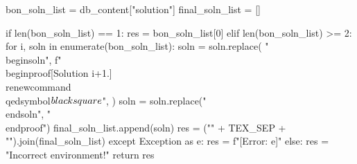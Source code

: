 \begin{pycode}
            bon_soln_list = db_content["solution"]
            final_soln_list = []

            if len(bon_soln_list) == 1:
                res = bon_soln_list[0]
            elif len(bon_soln_list) >= 2:
                for i, soln in enumerate(bon_soln_list):
                    soln = soln.replace(
                        "\\begin{soln}",
                        f"\\begin{{proof}}[Solution {i+1}.]\\renewcommand{{\\qedsymbol}}{{$\\blacksquare$}}",
                    )
                    soln = soln.replace("\\end{soln}", "\\end{proof}")
                    final_soln_list.append(soln)
                res = ("\n" + TEX_SEP + "\n").join(final_soln_list)
        except Exception as e:
            res = f"[Error: {e}]"
    else:
        res = "Incorrect environment!"
    return res
\end{pycode}

